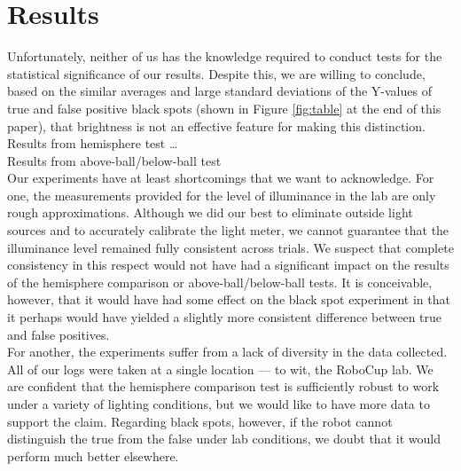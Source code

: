 \documentclass[11pt, twocolumn]{article}
\newcommand{\MARCUS}[1]{}
\begin{document}
{\section{Results}
Unfortunately, neither of us has the knowledge required to conduct tests for the statistical significance of our results. Despite this, we are willing to conclude, based on the similar averages and large standard deviations of the Y-values of true and false positive black spots (shown in Figure \ref{fig:table} at the end of this paper), that brightness is not an effective feature for making this distinction.\\
\indent \MARCUS{YOUR RESULTS HERE} Results from hemisphere test \ldots \\
\indent \MARCUS{YOUR RESULTS HERE} Results from above-ball/below-ball test \\
\indent Our experiments have at least shortcomings that we want to acknowledge. For one, the measurements provided for the level of illuminance in the lab are only rough approximations. Although we did our best to eliminate outside light sources and to accurately calibrate the light meter, we cannot guarantee that the illuminance level remained fully consistent across trials. We suspect that complete consistency in this respect would not have had a significant impact on the results of the hemisphere comparison or above-ball/below-ball tests. It is conceivable, however, that it would have had some effect on the black spot experiment in that it perhaps would have yielded a slightly more consistent difference between true and false positives. \\
\indent For another, the experiments suffer from a lack of diversity in the data collected. All of our logs were taken at a single location --- to wit, the RoboCup lab. We are confident that the hemisphere comparison test is sufficiently robust to work under a variety of lighting conditions, but we would like to have more data to support the claim. Regarding black spots, however, if the robot cannot distinguish the true from the false under lab conditions, we doubt that it would perform much better elsewhere.

}
\end{document}
